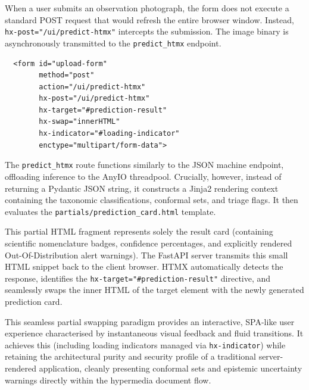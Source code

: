 When a user submits an observation photograph, the form does not execute a standard POST request that would refresh the entire browser window. Instead, \texttt{hx-post="/ui/predict-htmx"} intercepts the submission. The image binary is asynchronously transmitted to the \texttt{predict\_htmx} endpoint.

\begin{listing}[htpb]
\begin{verbatim}
  <form id="upload-form"
        method="post"
        action="/ui/predict-htmx"
        hx-post="/ui/predict-htmx"
        hx-target="#prediction-result"
        hx-swap="innerHTML"
        hx-indicator="#loading-indicator"
        enctype="multipart/form-data">
\end{verbatim}
\caption{HTMX declarative attributes binding the form submission to partial DOM swaps.}
\label{lst:htmx_form}
\end{listing}

The \texttt{predict\_htmx} route functions similarly to the JSON machine endpoint, offloading inference to the AnyIO threadpool. Crucially, however, instead of returning a Pydantic JSON string, it constructs a Jinja2 rendering context containing the taxonomic classifications, conformal sets, and triage flags. It then evaluates the \texttt{partials/prediction\_card.html} template.

This partial HTML fragment represents solely the result card (containing scientific nomenclature badges, confidence percentages, and explicitly rendered Out-Of-Distribution alert warnings). The FastAPI server transmits this small HTML snippet back to the client browser. HTMX automatically detects the response, identifies the \texttt{hx-target="\#prediction-result"} directive, and seamlessly swaps the inner HTML of the target element with the newly generated prediction card.

This seamless partial swapping paradigm provides an interactive, SPA-like user experience characterised by instantaneous visual feedback and fluid transitions. It achieves this (including loading indicators managed via \texttt{hx-indicator}) while retaining the architectural purity and security profile of a traditional server-rendered application, cleanly presenting conformal sets and epistemic uncertainty warnings directly within the hypermedia document flow.

